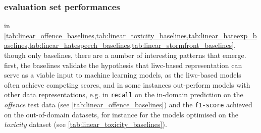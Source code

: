 \subsubsection{evaluation set performances}
in \cref{tab:linear_offence_baselines,tab:linear_toxicity_baselines,tab:linear_hateexp_baselines,tab:linear_hatespeech_baselines,tab:linear_stormfront_baselines}, though only baselines, there are a number of interesting patterns that emerge.
first, the baselines validate the hypothesis that liwc-based representation can serve as a viable input to machine learning models, as the liwc-based models often achieve competing scores, and in some instances out-perform models with other data representations, e.g. in \texttt{recall} on the in-domain prediction on the \textit{offence} test data (see \cref{tab:linear_offence_baselines}) and the \texttt{f1-score} achieved on the out-of-domain datasets, for instance for the models optimised on the \textit{toxicity} dataset (see \cref{tab:linear_toxicity_baselines}).
